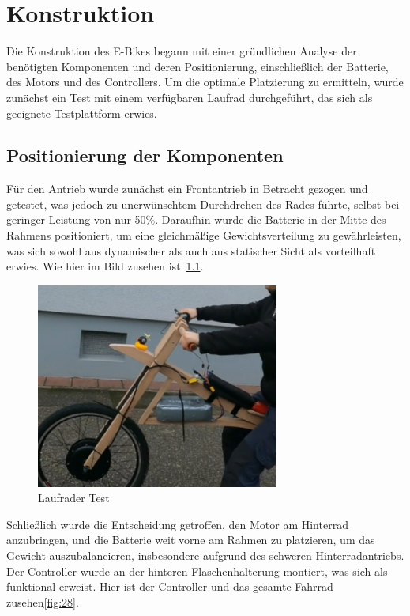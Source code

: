 \chapter{Konstruktion}

Die Konstruktion des E-Bikes begann mit einer gründlichen Analyse der benötigten Komponenten und deren Positionierung, einschließlich der Batterie, des Motors und des Controllers.
Um die optimale Platzierung zu ermitteln, wurde zunächst ein Test mit einem verfügbaren Laufrad durchgeführt, das sich als geeignete Testplattform erwies.

\section{Positionierung der Komponenten}

Für den Antrieb wurde zunächst ein Frontantrieb in Betracht gezogen und getestet, was jedoch zu unerwünschtem Durchdrehen des Rades führte, selbst bei geringer Leistung von nur 50\%.
Daraufhin wurde die Batterie in der Mitte des Rahmens positioniert, um eine gleichmäßige Gewichtsverteilung zu gewährleisten, was sich sowohl aus dynamischer als auch aus statischer Sicht als vorteilhaft erwies.
Wie hier im Bild zusehen ist~\ref{fig:27}.
\begin{figure}[h!]
    \centering
    \includegraphics[width=8cm]{images/Bild des Laufrads}
    \caption{Laufrader Test\cite{lorenz_scherrer_selbst_2023}}
    \label{fig:27}
\end{figure}


Schließlich wurde die Entscheidung getroffen, den Motor am Hinterrad anzubringen, und die Batterie weit vorne am Rahmen zu platzieren, um das Gewicht auszubalancieren, insbesondere aufgrund des schweren Hinterradantriebs. 
Der Controller wurde an der hinteren Flaschenhalterung montiert, was sich als funktional erweist. 
Hier ist der Controller und das gesamte Fahrrad zusehen\ref{fig:28}.


